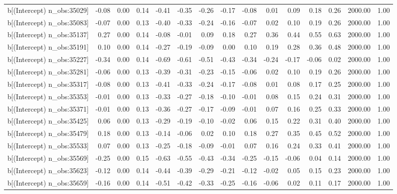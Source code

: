 \begin{table}[ht]
\begin{tabular}{rrrrrrrrrrrrrrr}
  b[(Intercept) n\_obs:35029] & -0.08 & 0.00 & 0.14 & -0.41 & -0.35 & -0.26 & -0.17 & -0.08 & 0.01 & 0.09 & 0.18 & 0.26 & 2000.00 & 1.00 \\ 
  b[(Intercept) n\_obs:35083] & -0.07 & 0.00 & 0.13 & -0.40 & -0.33 & -0.24 & -0.16 & -0.07 & 0.02 & 0.10 & 0.19 & 0.26 & 2000.00 & 1.00 \\ 
  b[(Intercept) n\_obs:35137] & 0.27 & 0.00 & 0.14 & -0.08 & -0.01 & 0.09 & 0.18 & 0.27 & 0.36 & 0.44 & 0.55 & 0.63 & 2000.00 & 1.00 \\ 
  b[(Intercept) n\_obs:35191] & 0.10 & 0.00 & 0.14 & -0.27 & -0.19 & -0.09 & 0.00 & 0.10 & 0.19 & 0.28 & 0.36 & 0.48 & 2000.00 & 1.00 \\ 
  b[(Intercept) n\_obs:35227] & -0.34 & 0.00 & 0.14 & -0.69 & -0.61 & -0.51 & -0.43 & -0.34 & -0.24 & -0.17 & -0.06 & 0.02 & 2000.00 & 1.00 \\ 
  b[(Intercept) n\_obs:35281] & -0.06 & 0.00 & 0.13 & -0.39 & -0.31 & -0.23 & -0.15 & -0.06 & 0.02 & 0.10 & 0.19 & 0.26 & 2000.00 & 1.00 \\ 
  b[(Intercept) n\_obs:35317] & -0.08 & 0.00 & 0.13 & -0.41 & -0.33 & -0.24 & -0.17 & -0.08 & 0.01 & 0.08 & 0.17 & 0.25 & 2000.00 & 1.00 \\ 
  b[(Intercept) n\_obs:35353] & -0.01 & 0.00 & 0.13 & -0.33 & -0.27 & -0.18 & -0.10 & -0.01 & 0.08 & 0.15 & 0.24 & 0.31 & 2000.00 & 1.00 \\ 
  b[(Intercept) n\_obs:35371] & -0.01 & 0.00 & 0.13 & -0.36 & -0.27 & -0.17 & -0.09 & -0.01 & 0.07 & 0.16 & 0.25 & 0.33 & 2000.00 & 1.00 \\ 
  b[(Intercept) n\_obs:35425] & 0.06 & 0.00 & 0.13 & -0.29 & -0.19 & -0.10 & -0.02 & 0.06 & 0.15 & 0.22 & 0.31 & 0.40 & 2000.00 & 1.00 \\ 
  b[(Intercept) n\_obs:35479] & 0.18 & 0.00 & 0.13 & -0.14 & -0.06 & 0.02 & 0.10 & 0.18 & 0.27 & 0.35 & 0.45 & 0.52 & 2000.00 & 1.00 \\ 
  b[(Intercept) n\_obs:35533] & 0.07 & 0.00 & 0.13 & -0.25 & -0.18 & -0.09 & -0.01 & 0.07 & 0.16 & 0.24 & 0.33 & 0.41 & 2000.00 & 1.00 \\ 
  b[(Intercept) n\_obs:35569] & -0.25 & 0.00 & 0.15 & -0.63 & -0.55 & -0.43 & -0.34 & -0.25 & -0.15 & -0.06 & 0.04 & 0.14 & 2000.00 & 1.00 \\ 
  b[(Intercept) n\_obs:35623] & -0.12 & 0.00 & 0.14 & -0.44 & -0.39 & -0.29 & -0.21 & -0.12 & -0.02 & 0.05 & 0.15 & 0.23 & 2000.00 & 1.00 \\ 
  b[(Intercept) n\_obs:35659] & -0.16 & 0.00 & 0.14 & -0.51 & -0.42 & -0.33 & -0.25 & -0.16 & -0.06 & 0.02 & 0.11 & 0.17 & 2000.00 & 1.00 \\ 

\end{tabular}
\end{table}
